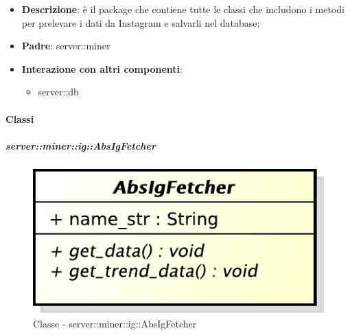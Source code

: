 \begin{itemize}
  \item \textbf{Descrizione}: è il package che contiene tutte le classi che includono i metodi per prelevare i dati da Instagram e salvarli nel database;
  \item \textbf{Padre}: server::miner
   \item \textbf{Interazione con altri componenti}:
  	\begin{itemize}
  		\item server::db
  	\end{itemize}
\end{itemize}

	\paragraph{Classi} %
	\subparagraph{server::miner::ig::AbsIgFetcher} %
		\label{subp:server_miner_ig_AbsIgFetcher}
		    \begin{figure}[H]
 		 		\centering
 				\centerline{\includegraphics[scale=0.75]{./images/server/classes/miner/abs_ig_fetcher.pdf}}
 				\caption{Classe - server::miner::ig::AbsIgFetcher}
			\end{figure}
